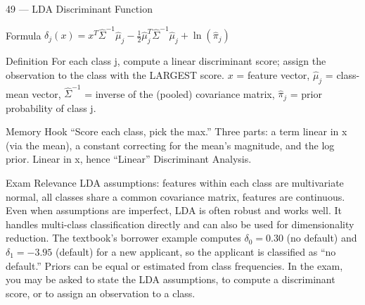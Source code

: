 \documentclass[aspectratio=169,8pt]{beamer}
\begin{document}
	\begin{frame}{49 --- LDA Discriminant Function}
		\begin{block}{Formula}
			$\delta_j(x) = x^T\hat{\Sigma}^{-1}\hat{\mu}_j - \tfrac12\hat{\mu}_j^T\hat{\Sigma}^{-1}\hat{\mu}_j + \ln(\hat{\pi}_j)$
		\end{block}
		\begin{block}{Definition}
			For each class j, compute a linear discriminant score; assign the observation to the class with the LARGEST score. $x$ = feature vector, $\hat{\mu}_j$ = class-mean vector, $\hat{\Sigma}^{-1}$ = inverse of the (pooled) covariance matrix, $\hat{\pi}_j$ = prior probability of class j.
		\end{block}
		\begin{block}{Memory Hook}
			``Score each class, pick the max.'' Three parts: a term linear in x (via the mean), a constant correcting for the mean's magnitude, and the log prior. Linear in x, hence ``Linear'' Discriminant Analysis.
		\end{block}
		\begin{block}{Exam Relevance}
			LDA assumptions: features within each class are multivariate normal, all classes share a common covariance matrix, features are continuous. Even when assumptions are imperfect, LDA is often robust and works well. It handles multi-class classification directly and can also be used for dimensionality reduction. The textbook's borrower example computes $\delta_0 = 0.30$ (no default) and $\delta_1 = -3.95$ (default) for a new applicant, so the applicant is classified as ``no default.'' Priors can be equal or estimated from class frequencies. In the exam, you may be asked to state the LDA assumptions, to compute a discriminant score, or to assign an observation to a class.
		\end{block}
	\end{frame}
	
\end{document}
